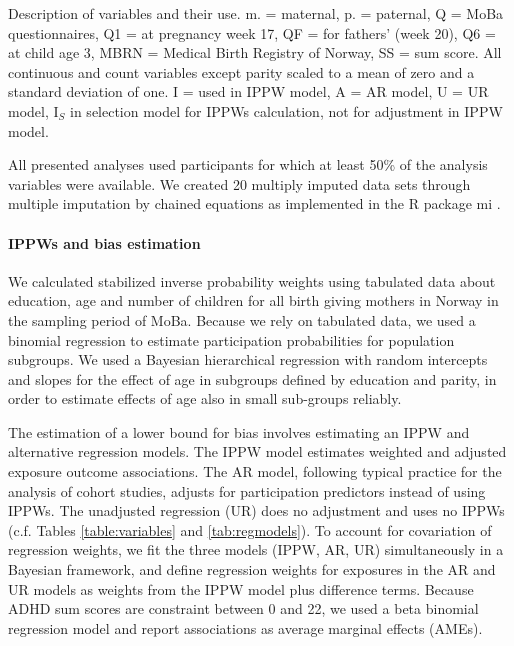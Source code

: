 \documentclass[12pt]{article}
\begin{document}
\begin{table}[ht]
	\centering
	\caption{Description of variables and their use.
		\newline m. = maternal, p. = paternal, Q = MoBa questionnaires, Q1 = at pregnancy week 17, QF = for fathers' (week 20), Q6 = at child age 3, MBRN = Medical Birth Registry of Norway, SS = sum score. All continuous and count variables except parity scaled to a mean of zero and a standard deviation of one. I = used in IPPW model, A = AR model, U = UR model, I$_S$ in selection model for IPPWs calculation, not for adjustment in IPPW model.} 
	\label{table:variables}
\end{table}


All presented analyses used participants for which at least 50\% of the analysis variables were available. We created 20 multiply imputed data sets through multiple imputation by chained equations as implemented in the R package mi \cite{Su2011-he}. 

\paragraph{IPPWs and bias estimation}

We calculated stabilized inverse probability weights using tabulated data about education, age and number of children for all birth giving mothers in Norway in the sampling period of MoBa. Because we rely on tabulated data, we used a binomial regression to estimate participation probabilities for population subgroups. We used a Bayesian hierarchical regression with random intercepts and slopes for the effect of age in subgroups defined by education and parity, in order to estimate effects of age also in small sub-groups reliably.


The estimation of a lower bound for bias involves estimating an IPPW and alternative regression models. The IPPW model estimates weighted and adjusted exposure outcome associations. The AR model, following typical practice for the analysis of cohort studies, adjusts for participation predictors instead of using IPPWs. The unadjusted regression (UR) does no adjustment and uses no IPPWs (c.f. Tables \ref{table:variables} and \ref{tab:regmodels}). To account for covariation of regression weights, we fit the three models (IPPW, AR, UR) simultaneously in a Bayesian framework, and define regression weights for exposures in the AR and UR models as weights from the IPPW model plus difference terms. Because ADHD sum scores are constraint between 0 and 22, we used a beta binomial regression model and report associations as average marginal effects (AMEs).
\end{document}
